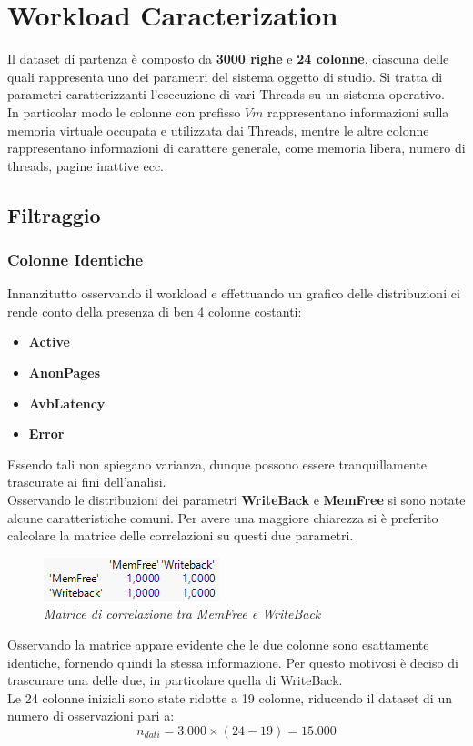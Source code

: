 \chapter{Workload Caracterization}
Il dataset di partenza è composto da \textbf{3000 righe} e \textbf{24 colonne}, ciascuna delle quali rappresenta uno dei parametri del sistema oggetto di studio. Si tratta di parametri caratterizzanti l'esecuzione di vari Threads su un sistema operativo.
\\In particolar modo le colonne con prefisso $Vm$ rappresentano informazioni sulla memoria virtuale occupata e utilizzata dai Threads, mentre le altre colonne rappresentano informazioni di carattere generale, come memoria libera, numero di threads, pagine inattive ecc.

\section{Filtraggio}

\subsection{Colonne Identiche}
Innanzitutto osservando il workload e effettuando un grafico delle distribuzioni ci rende conto della presenza di ben 4 colonne costanti:
\begin{itemize}
	\item \textbf{Active}
	\item \textbf{AnonPages}
	\item \textbf{AvbLatency}
	\item \textbf{Error}
\end{itemize}
Essendo tali non spiegano varianza, dunque possono essere tranquillamente trascurate ai fini dell'analisi.
\\Osservando le distribuzioni dei parametri \textbf{WriteBack} e \textbf{MemFree} si sono notate alcune caratteristiche comuni. Per avere una maggiore chiarezza si è preferito calcolare la matrice delle correlazioni su questi due parametri.
\begin{figure}[H]
	\centering
	\includegraphics{img/hw1/correlazione_mem_writeback.png}
	\caption{\textit{Matrice di correlazione tra MemFree e WriteBack}}
\end{figure}
Osservando la matrice appare evidente che le due colonne sono esattamente identiche, fornendo quindi la stessa informazione. Per questo motivosi è deciso di trascurare una delle due, in particolare quella di WriteBack.
\\Le 24 colonne iniziali sono state ridotte a 19 colonne, riducendo il dataset di un numero di osservazioni pari a:
\begin{equation}
	n_{dati} = 3.000 \times (24 - 19) = 15.000
\end{equation}

